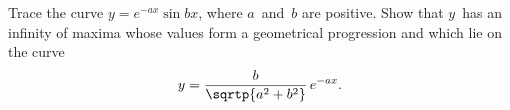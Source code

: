 Trace the curve $y = e^{-ax}\sin bx$, where $a$~and~$b$ are positive. Show
that $y$~has an infinity of maxima whose values form a geometrical progression
and which lie on the curve
\[
y = \frac{b}{\sqrtp{a^{2} + b^{2}}}\, e^{-ax}.
\]

